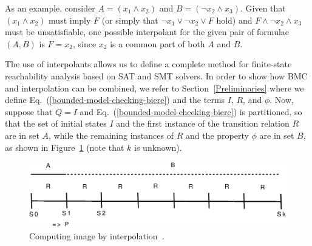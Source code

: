 \documentclass[format=acmsmall, review=false, screen=true]{acmart}
\begin{document}
As an example, consider $A = \left(x_1 \wedge x_2\right)$ and $B = \left(\neg x_2 \wedge x_3\right)$. Given that $\left(x_1 \wedge x_2\right)$ must imply $F$ (or simply that $\neg x_1 \vee \neg x_2 \vee F$ hold) and $F \wedge \neg x_2 \wedge x_3$ must be unsatisfiable, one possible interpolant for the given pair of formulae $\left(A,B\right)$ is $F = x_2$, since $x_2$ is a common part of both $A$ and $B$. 

The use of interpolants allows us to define a complete method for finite-state reachability analysis based on SAT and SMT solvers. In order to show how BMC and interpolation can be combined, we refer to Section~\ref{Preliminaries} where we define Eq.~(\ref{bounded-model-checking-biere}) and the terms $I$, $R$, and $\phi$. Now, suppose that $Q=I$ and Eq.~(\ref{bounded-model-checking-biere}) is partitioned, so that the set of initial states $I$ and the first instance of the transition relation $R$ are in set $A$, while the remaining instances of $R$ and the property $\phi$ are in set $B$, as shown in Figure~\ref{figure:computing-image-by-interpolation} (note that $k$ is unknown).

\begin{figure}[ht]
\centering
\includegraphics[scale=0.4]{interpolants}
\caption{Computing image by interpolation~\cite{McMillan03}.}
\label{figure:computing-image-by-interpolation}
\end{figure}
\end{document}

